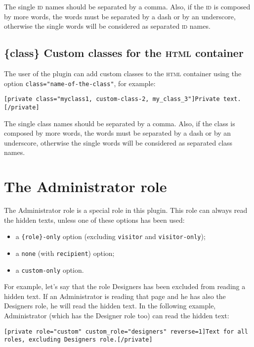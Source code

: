 The single \textsc{id} names should be separated by a comma. Also, if the
\textsc{id} is composed by more words, the words must be separated by a dash or
by an underscore, otherwise the single words will be considered as separated
\textsc{id} names.

\section{\{class\} Custom classes for the \textsc{html} container}

The user of the plugin can add custom classes to the \textsc{html} container
using the option \verb+class="name-of-the-class"+, for example:

\begin{lstlisting}
[private class="myclass1, custom-class-2, my_class_3"]Private text.[/private]
\end{lstlisting}

The single class names should be separated by a comma. Also, if the class is
composed by more words, the words must be separated by a dash or by an
underscore, otherwise the single words will be considered as separated class
names.

\chapter{The Administrator role}

\label{sec:admin-role}

The Administrator role is a special role in this plugin. This role can always
read the hidden texts, unless one of these options has been used:

\begin{itemize}
 \item a \verb+{role}-only+ option (excluding \verb+visitor+ and
 \verb+visitor-only+);
 \item a \verb+none+ (with \verb+recipient+) option;
 \item a \verb+custom-only+ option.
\end{itemize}

For example, let's say that the role Designers has been excluded from reading a
hidden text. If an Administrator is reading that page and he has also the
Designers role, he will read the hidden text. In the following example,
Administrator (which has the Designer role too) can read the hidden text:

\begin{lstlisting}
[private role="custom" custom_role="designers" reverse=1]Text for all roles, excluding Designers role.[/private]
\end{lstlisting}

